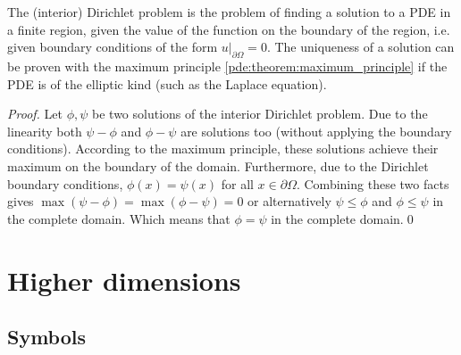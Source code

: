     The (interior) Dirichlet problem is the problem of finding a solution to a PDE in a finite region, given the value of the function on the boundary of the region, i.e. given boundary conditions of the form $u|_{\partial\Omega}=0$. The uniqueness of a solution can be proven with the maximum principle \ref{pde:theorem:maximum_principle} if the PDE is of the elliptic kind (such as the Laplace equation).

    \begin{proof}
        Let $\phi,\psi$ be two solutions of the interior Dirichlet problem. Due to the linearity both $\psi-\phi$ and $\phi-\psi$ are solutions too (without applying the boundary conditions). According to the maximum principle, these solutions achieve their maximum on the boundary of the domain. Furthermore, due to the Dirichlet boundary conditions, $\phi(x)=\psi(x)$ for all $x\in\partial\Omega$. Combining these two facts gives $\max(\psi-\phi) = \max(\phi-\psi) = 0$ or alternatively $\psi\leq\phi$ and $\phi\leq\psi$ in the complete domain. Which means that $\phi=\psi$ in the complete domain.\qed
    \end{proof}



\section{Higher dimensions}\label{pde:section:higher_dimensions}
\subsection{Symbols}


